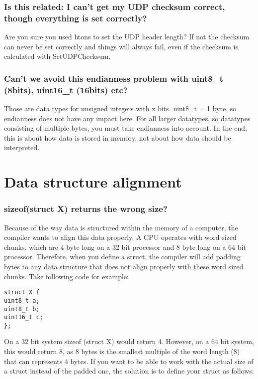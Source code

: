 \documentclass[a4paper]{article}
\begin{document}
\subsubsection*{Is this related: I can't get my UDP checksum correct, though everything
is set correctly?}

Are you sure you used htons to set the UDP header length? If not the
checksum can never be set correctly and things will always fail, even if
the checksum is calculated with SetUDPChecksum.

\subsubsection*{Can't we avoid this endianness problem with uint8\_t (8bits), uint16\_t
(16bits) etc?}

Those are data types for unsigned integers with x bits. uint8\_t = 1
byte, so endianness does not have any impact here. For all larger
datatypes, so datatypes consisting of multiple bytes, you must take
endianness into account. In the end, this is about how data is stored in
memory, not about how data should be interpreted.

\section{Data structure alignment}
\subsubsection*{sizeof(struct X) returns the wrong size?}
Because of the way data is structured within the memory of a computer, the compiler wants to align this data properly. A CPU operates with word sized chunks, which are 4 byte long on a 32 bit processor and 8 byte long on a 64 bit processor. Therefore, when you define a struct, the compiler will add padding bytes to any data structure that does not align properly with these word sized chunks. Take following code for example:

\begin{lstlisting}
struct X {
uint8_t a;
uint8_t b;
uint16_t c;
};
\end{lstlisting}

On a 32 bit system sizeof (struct X) would return 4. However, on a 64 bit system, this would return 8, as 8 bytes is the smallest multiple of the word length (8) that can represents 4 bytes. If you want to be able to work with the actual size of a struct instead of the padded one, the solution is to define your struct as follows:
\end{document}
